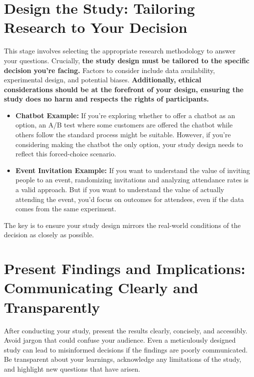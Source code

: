 \documentclass[
  letterpaper,
  DIV=11,
  numbers=noendperiod]{scrreprt}
\providecommand{\tightlist}{%
  \setlength{\itemsep}{0pt}\setlength{\parskip}{0pt}}\usepackage{longtable,booktabs,array}
\begin{document}
\section{Design the Study: Tailoring Research to Your
Decision}\label{design-the-study-tailoring-research-to-your-decision}

This stage involves selecting the appropriate research methodology to
answer your questions. Crucially, \textbf{the study design must be
tailored to the specific decision you're facing.} Factors to consider
include data availability, experimental design, and potential biases.
\textbf{Additionally, ethical considerations should be at the forefront
of your design, ensuring the study does no harm and respects the rights
of participants.}

\begin{itemize}
\tightlist
\item
  \textbf{Chatbot Example:} If you're exploring whether to offer a
  chatbot as an option, an A/B test where some customers are offered the
  chatbot while others follow the standard process might be suitable.
  However, if you're considering making the chatbot the only option,
  your study design needs to reflect this forced-choice scenario.
\item
  \textbf{Event Invitation Example:} If you want to understand the value
  of inviting people to an event, randomizing invitations and analyzing
  attendance rates is a valid approach. But if you want to understand
  the value of actually attending the event, you'd focus on outcomes for
  attendees, even if the data comes from the same experiment.
\end{itemize}

The key is to ensure your study design mirrors the real-world conditions
of the decision as closely as possible.

\section{Present Findings and Implications: Communicating Clearly and
Transparently}\label{present-findings-and-implications-communicating-clearly-and-transparently}

After conducting your study, present the results clearly, concisely, and
accessibly. Avoid jargon that could confuse your audience. Even a
meticulously designed study can lead to misinformed decisions if the
findings are poorly communicated. Be transparent about your learnings,
acknowledge any limitations of the study, and highlight new questions
that have arisen.
\end{document}
